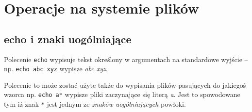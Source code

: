 % 
% 
% 
% 

\section{Operacje na systemie plików}

\subsection{echo i znaki uogólniające}

Polecenie \Verb$echo$ wypisuje tekst określony w argumentach na standardowe wyjście
– np. \Verb$echo abc xyz$ wypisze \textit{abc xyz}.

Polecenie to może zostać użyte także do wypisania plików pasujących do jakiegoś wzorca np. \Verb$echo a*$ wypisze pliki zaczynające się literą \textit{a}. Jest to spowodowane tym iż znak \Verb$*$ jest jednym ze \textit{znaków uogólniających} powłoki.


